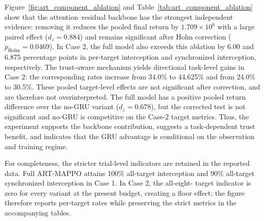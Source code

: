 Figure~\ref{fig:art_component_ablation} and
Table~\ref{tab:art_component_ablation} show that the
attention--residual backbone has the strongest independent evidence: removing
it reduces the pooled final return by $1.709\times10^6$ with a large paired
effect ($d_z=0.884$) and remains significant after Holm correction
($p_{\mathrm{Holm}}=0.0469$). In Case 2, the full model also exceeds this
ablation by 6.00 and 6.875 percentage points in per-target interception and
synchronized interception, respectively. The trust-aware mechanism yields
directional task-level gains in Case 2: the corresponding rates increase from
34.0\% to 44.625\% and from 24.0\% to 30.5\%. These pooled target-level
effects are not significant after correction, and are therefore not
overinterpreted. The full model has a positive pooled return difference over
the no-GRU variant ($d_z=0.678$), but the corrected test is not significant
and no-GRU is competitive on the Case-2 target metrics. Thus, the experiment
supports the backbone contribution, suggests a task-dependent trust benefit,
and indicates that the GRU advantage is conditional on the observation and
training regime.

For completeness, the stricter trial-level indicators are retained in the
reported data. Full ART-MAPPO attains 100\% all-target interception and 90\%
all-target synchronized interception in Case 1. In Case 2, the all-eight-
target indicator is zero for every variant at the present budget, creating a
floor effect; the figure therefore reports per-target rates while preserving
the strict metrics in the accompanying tables.
